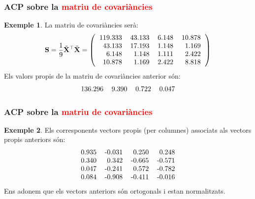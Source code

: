 \documentclass[12pt,t]{beamer}
\newcommand{\red}[1]{\textcolor{red}{#1}}
\theoremstyle{plain}
\theoremstyle{definition}
\newtheorem{exemple}{Exemple}
\begin{document}
\begin{frame}
\frametitle{ACP sobre la \red{matriu de covariàncies}}
\begin{exemple}

La matriu de covariàncies serà:
{\small\[
\mathbf{S}=\frac{1}{9}\tilde{\mathbf{X}}^\top\tilde{\mathbf{X}}=
\left(
\begin{tabular}{rrrr}
  119.333 & 43.133 & 6.148 & 10.878 \\ 
  43.133 & 17.193 & 1.148 & 1.169 \\ 
  6.148 & 1.148 & 1.111 & 2.422 \\ 
  10.878 & 1.169 & 2.422 & 8.818 \\ 
  \end{tabular}\right)
\]}
Els valors propis de la matriu de covariàncies anterior són:
\[
\begin{tabular}{rrrr}
  136.296 & 9.390 & 0.722 & 0.047 \\ 
  \end{tabular}\]

\end{exemple}
\end{frame}


\begin{frame}
\frametitle{ACP sobre la \red{matriu de covariàncies}}
\begin{exemple}
Els corresponents vectors propis (per columnes) associats als vectors propis anteriors són:
\[
\begin{tabular}{rrrr}
  0.935 & -0.031 & 0.250 & 0.248 \\ 
  0.340 & 0.342 & -0.665 & -0.571 \\ 
  0.047 & -0.241 & 0.572 & -0.782 \\ 
  0.084 & -0.908 & -0.411 & -0.016 \\ 
  \end{tabular}\]
Ens adonem que els vectors anteriors són ortogonals i estan normalitzats.


\end{exemple}
\end{frame}
\end{document}
